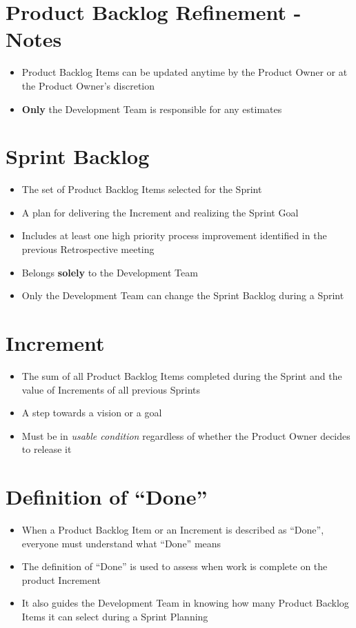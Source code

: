 \documentclass[a4paper,11pt,twocolumn]{article}
\begin{document}
\section*{Product Backlog Refinement - Notes}
\begin{itemize}
	\item Product Backlog Items can be updated anytime by the Product Owner or at the Product Owner's discretion
	\item \textbf{Only} the Development Team is responsible for any estimates
\end{itemize}

\section*{Sprint Backlog}
\begin{itemize}
	\item The set of Product Backlog Items selected for the Sprint
	\item A plan for delivering the Increment and realizing the Sprint Goal
	\item Includes at least one high priority process improvement identified in the previous Retrospective meeting
	\item Belongs \textbf{solely} to the Development Team
	\item Only the Development Team can change the Sprint Backlog during a Sprint
\end{itemize}

\section*{Increment}
\begin{itemize}
	\item The sum of all Product Backlog Items completed during the Sprint and the value of Increments of all previous Sprints
	\item A step towards a vision or a goal
	\item Must be in \textit{usable condition} regardless of whether the Product Owner decides to release it
\end{itemize}

\section*{Definition of ``Done''}
\begin{itemize}
	\item When a Product Backlog Item or an Increment is described as ``Done'', everyone must understand what ``Done'' means
	\item The definition of ``Done'' is used to assess when work is complete on the product Increment
    \item It also guides the Development Team in knowing how many Product Backlog Items it can select during a Sprint Planning
\end{itemize}
\end{document}
